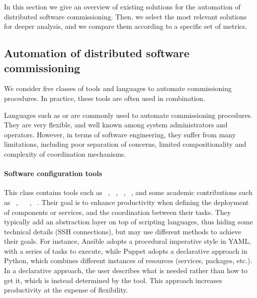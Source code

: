 


In this section we give an overview of existing solutions for the
automation of distributed software commissioning. Then, we select the
most relevant solutions for deeper analysis, and we compare them
according to a specific set of metrics.

\subsection{Automation of distributed software commissioning}
\label{sec:rwclasses}

We consider five classes of tools and languages to automate
commissioning procedures. In practice, these tools are often used in
combination.

Languages such as \bash or \ruby are commonly used to automate
commissioning procedures. They are very flexible, and well known among
system administrators and operators. However, in terms of software
engineering, they suffer from many limitations, including poor
separation of concerns, limited compositionality and complexity of
coordination mechanisms.

\paragraph{Software configuration tools}
This class contains tools such as \ansible~\cite{ansible:web},
\puppet~\cite{puppet:web}, \chef~\cite{chef:web},
\salt~\cite{salt:web}, and some academic contributions such as
\smartfrog~\cite{10.1145/1496909.1496915},
\engage~\cite{DBLP:conf/pldi/FischerME12}
\deployware~\cite{flissi2008ccgrid},
\aeolus~\cite{dicosmo2014ic,dicosmo:hal-01233489}. Their goal is to
enhance productivity when defining the deployment of components or
services, and the coordination between their tasks. They typically add
an abstraction layer on top of scripting languages, thus hiding some
technical details (\eg SSH connections), but may use different methods
to achieve their goals. For instance, Ansible adopts a procedural
imperative style in YAML, with a series of tasks to execute, while
Puppet adopts a declarative approach in Python, which combines
different instances of resources (\ie services, packages, etc.). In a
declarative approach, the user describes what is needed rather than how
to get it, which is instead determined by the tool. This approach
increases productivity at the expense of flexibility.

